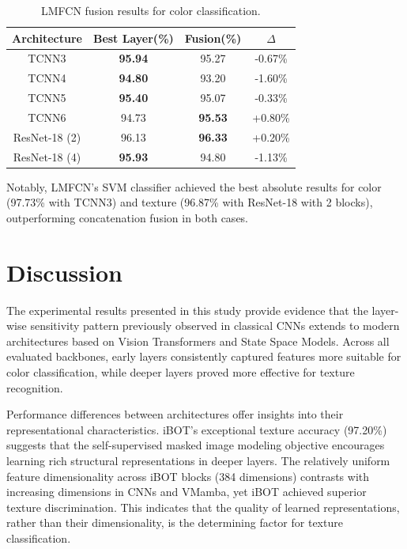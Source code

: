 \documentclass[conference]{IEEEtran}
\begin{document}
\begin{table}[H] 
\caption{LMFCN fusion results for color classification.}
\begin{center}
\begin{tabular}{c|c|c|c}
\hline
\textbf{Architecture} & \textbf{Best Layer(\%)} & \textbf{Fusion(\%)} & \textbf{$\Delta$}\\
\hline
TCNN3 & \textbf{95.94} & 95.27 & -0.67\% \\
TCNN4 & \textbf{94.80} & 93.20 & -1.60\% \\
TCNN5 & \textbf{95.40} & 95.07 & -0.33\% \\
TCNN6 & 94.73 & \textbf{95.53} & +0.80\% \\
ResNet-18 (2) & 96.13 & \textbf{96.33} & +0.20\% \\
ResNet-18 (4) & \textbf{95.93} & 94.80 & -1.13\% \\
\hline
\end{tabular}
\label{tab10}
\end{center}
\end{table}





Notably, LMFCN's SVM classifier achieved the best absolute results for color (97.73\% with TCNN3) and texture (96.87\% with ResNet-18 with 2 blocks), outperforming concatenation fusion in both cases.




\section{Discussion}

The experimental results presented in this study provide evidence that the layer-wise sensitivity pattern previously observed in classical CNNs extends to modern architectures based on Vision Transformers and State Space Models. Across all evaluated backbones, early layers consistently captured features more suitable for color classification, while deeper layers proved more effective for texture recognition. 

Performance differences between architectures offer insights into their representational characteristics. iBOT's exceptional texture accuracy (97.20\%) suggests that the self-supervised masked image modeling objective encourages learning rich structural representations in deeper layers. The relatively uniform feature dimensionality across iBOT blocks (384 dimensions) contrasts with increasing dimensions in CNNs and VMamba, yet iBOT achieved superior texture discrimination. This indicates that the quality of learned representations, rather than their dimensionality, is the determining factor for texture classification.
\end{document}
